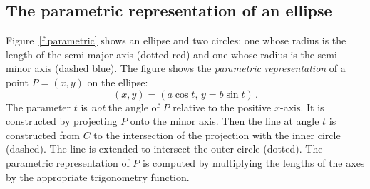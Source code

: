 
\subsection{The parametric representation of an ellipse}

Figure~\ref{f.parametric} shows an ellipse and two circles: one whose radius is the length of the semi-major axis (dotted red) and one whose radius is the semi-minor axis (dashed blue). The figure shows the \emph{parametric representation} of a point $P=(x,y)$ on the ellipse:
\[
(x,y)= (a\cos t,\, y = b \sin t)\,.
\]
The parameter $t$ is \emph{not} the angle of $P$ relative to the positive $x$-axis. It is constructed by projecting $P$ onto the minor axis. Then the line at angle $t$ is constructed from $C$ to the intersection of the projection with the inner circle (dashed). The line is extended to intersect the outer circle (dotted). The parametric representation of $P$ is computed by multiplying the lengths of the axes by the appropriate trigonometry function.


